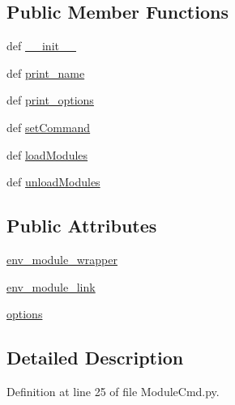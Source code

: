 \subsection*{Public Member Functions}
\begin{DoxyCompactItemize}
\item 
def \hyperlink{classModuleCmd_1_1ModuleCmd_afc2639b024f0254c9a1e4db7c0e890cf}{\-\_\-\-\_\-init\-\_\-\-\_\-}
\item 
def \hyperlink{classModuleCmd_1_1ModuleCmd_ae44917ee5bdcc85a4b1675f82a2f03b3}{print\-\_\-name}
\item 
def \hyperlink{classModuleCmd_1_1ModuleCmd_a731bb50ac44c88e49675b9790740a9af}{print\-\_\-options}
\item 
def \hyperlink{classModuleCmd_1_1ModuleCmd_aafcfb3f7b8d445df29c888c938c932fd}{set\-Command}
\item 
def \hyperlink{classModuleCmd_1_1ModuleCmd_acb50720c70196a40e3bde85f79fea3cb}{load\-Modules}
\item 
def \hyperlink{classModuleCmd_1_1ModuleCmd_a93a6a59db499c50ffb9ffe8e043a4733}{unload\-Modules}
\end{DoxyCompactItemize}
\subsection*{Public Attributes}
\begin{DoxyCompactItemize}
\item 
\hyperlink{classModuleCmd_1_1ModuleCmd_ae60edec82191b5a7a1830495b1ca2e3e}{env\-\_\-module\-\_\-wrapper}
\item 
\hyperlink{classModuleCmd_1_1ModuleCmd_a1b4a34e278600fe59cd55bb0d56baa61}{env\-\_\-module\-\_\-link}
\item 
\hyperlink{classModuleCmd_1_1ModuleCmd_a981a0fc879a722b76faa16b4289ab953}{options}
\end{DoxyCompactItemize}


\subsection{Detailed Description}


Definition at line 25 of file Module\-Cmd.\-py.



